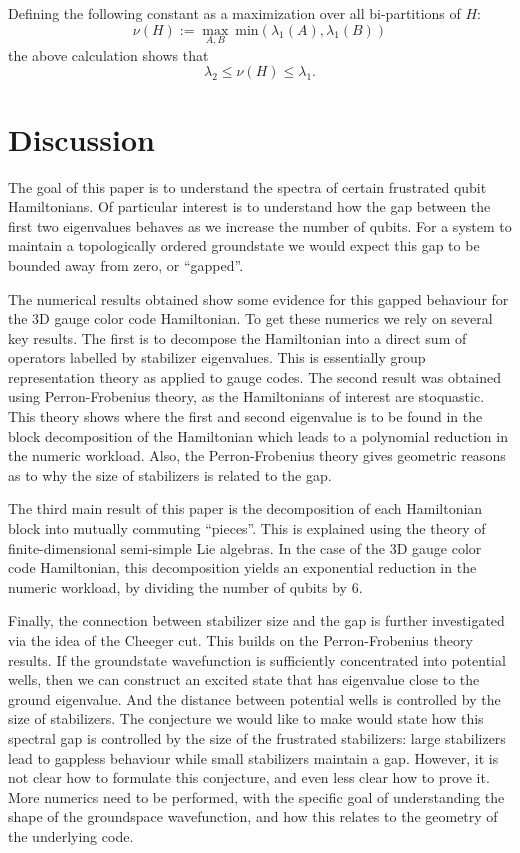\documentclass[11pt,oneside]{article}
\def\Ham{H}
\begin{document}
Defining the following constant as a maximization over
all bi-partitions of $\Ham:$
$$
    \nu(\Ham) := \max_{A, B}\ \mbox{min}(\lambda_1(A), \lambda_1(B))
$$
the above calculation shows that
$$
    \lambda_2 \le \nu(\Ham) \le \lambda_1.
$$



\section{Discussion}


The goal of this paper is to understand the spectra of
certain frustrated qubit Hamiltonians. Of particular interest is
to understand how 
the gap between the first two eigenvalues behaves as we 
increase the number of qubits.
For a system to maintain a topologically ordered groundstate
we would expect this gap to be bounded away from zero, or ``gapped''.

The numerical results obtained show some evidence for
this gapped behaviour for the 3D gauge color code Hamiltonian.
To get these numerics we rely on several key results.
The first is to decompose the Hamiltonian into a direct sum
of operators labelled by stabilizer eigenvalues.
This is essentially group representation theory as applied to
gauge codes.
The second result was obtained using Perron-Frobenius theory, as the
Hamiltonians of interest are stoquastic.
This theory shows where the first and second eigenvalue
is to be found in the block decomposition of the Hamiltonian
which leads to a polynomial reduction in the numeric workload.
Also, the Perron-Frobenius theory gives geometric reasons as to
why the size of stabilizers is related to the gap.

The third main result of this paper is the decomposition of
each Hamiltonian block into mutually commuting ``pieces''.
This is explained using the theory of finite-dimensional semi-simple
Lie algebras.
In the case of the 3D gauge color code Hamiltonian, this
decomposition yields an exponential reduction in 
the numeric workload, by dividing the number of qubits by 6.

Finally, the connection between stabilizer size and the gap is further 
investigated via the idea of the Cheeger cut. 
This builds on the Perron-Frobenius theory results.
If the groundstate wavefunction is sufficiently concentrated
into potential wells, then we can construct an excited state
that has eigenvalue close to the ground eigenvalue.
And the distance between potential wells is controlled by
the size of stabilizers.
The conjecture we would like to make would state 
how this spectral gap is controlled by the size of the frustrated
stabilizers: large stabilizers lead to gappless behaviour while
small stabilizers maintain a gap.
However, it is not clear how to formulate this conjecture, and
even less clear how to prove it. 
More numerics need to be performed, with the specific
goal of understanding the shape of the groundspace wavefunction,
and how this relates to the geometry of the underlying code.
\end{document}
